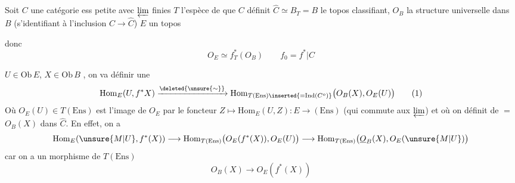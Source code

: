 Soit $C$ une catégorie ess petite avec $\varprojlim$ finies
$T$ l'espèce de  que $C$ définit
$\widehat C\simeq B_T=B$ le topos classifiant, $O_B$ la structure universelle
dans $B$ (s'identifiant à l'inclusion $C\longrightarrow\widehat C$)
$E$ un topos

 donc
\[
 O_E\simeq f_T^*(O_B)\qquad f_0=f^*|C
\]

$U\in\mathrm{Ob}\,E$, $X\in\mathrm{Ob}\,B$ , on va définir une
\[
 \mathrm{Hom}_E(U,f^*X)\xrightarrow{\deleted{\unsure{\sim}}}
 \mathrm{Hom}_{T(\mathrm{Ens})\inserted{=\mathrm{Ind}(C^o)}}\bigl(O_B(X),O_E(U)\bigr)\tag*{(1)}
\]
Où $O_E(U)\in T(\mathrm{Ens})$ est l'image de $O_E$  par le
foncteur $Z\longmapsto\mathrm{Hom}_E(U,Z):E\longrightarrow(\mathrm{Ens})$ (qui
commute aux $\varprojlim$) et où on définit de $=$
$O_B(X)$ dans $\widehat C$. En effet, on a
{\scriptsize
\[
 \mathrm{Hom}_E(\unsure{M|U},f^*(X))\longrightarrow
 \mathrm{Hom}_{T(\mathrm{Ens})}\bigl(O_E(f^*(X)),O_E(U)\bigr)
 \longrightarrow\mathrm{Hom}_{T(\mathrm{Ens})}\bigl(\underline{O}_B(X),O_E(\unsure{M|U})\bigr)
\]
}
car on a un morphisme de $T(\mathrm{Ens})$
\[
 O_B(X)\longrightarrow O_E(f^*(X))
\]
